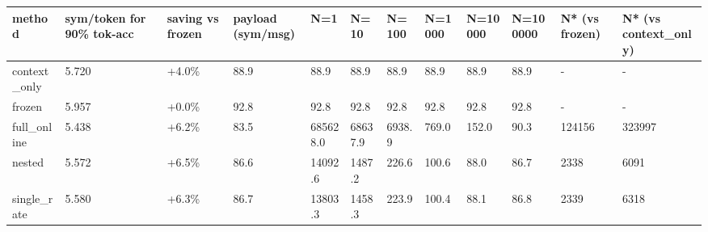 \begin{tabular}{llllllllllll}
\hline
method & sym/token for 90\% tok-acc & saving vs frozen & payload (sym/msg) & N=1 & N=10 & N=100 & N=1000 & N=10000 & N=100000 & N* (vs frozen) & N* (vs context\_only) \\
\hline
context\_only & 5.720 & +4.0\% & 88.9 & 88.9 & 88.9 & 88.9 & 88.9 & 88.9 & 88.9 & - & - \\
frozen & 5.957 & +0.0\% & 92.8 & 92.8 & 92.8 & 92.8 & 92.8 & 92.8 & 92.8 & - & - \\
full\_online & 5.438 & +6.2\% & 83.5 & 685628.0 & 68637.9 & 6938.9 & 769.0 & 152.0 & 90.3 & 124156 & 323997 \\
nested & 5.572 & +6.5\% & 86.6 & 14092.6 & 1487.2 & 226.6 & 100.6 & 88.0 & 86.7 & 2338 & 6091 \\
single\_rate & 5.580 & +6.3\% & 86.7 & 13803.3 & 1458.3 & 223.9 & 100.4 & 88.1 & 86.8 & 2339 & 6318 \\
\hline
\end{tabular}

